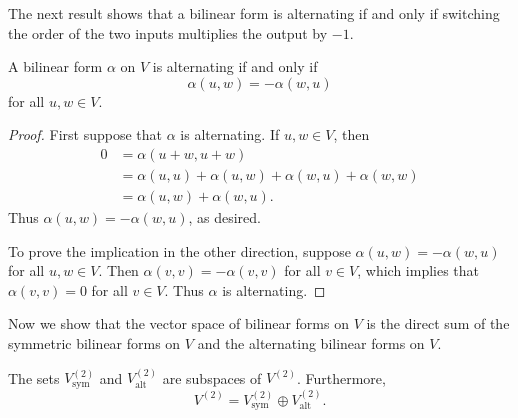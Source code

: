 The next result shows that a bilinear form is alternating if and only if
switching the order of the two inputs multiplies the output by $-1$.

\begin{result}\label{ax:9.16}
A bilinear form $\alpha$ on $V$ is alternating if and only if
\[ \alpha(u,w) = -\alpha(w,u) \]
for all $u,w\in V$.
\end{result}

\begin{proof}
First suppose that $\alpha$ is alternating. If $u,w\in V$, then
\begin{align*}
0 &= \alpha(u+w,u+w)\\
  &= \alpha(u,u)+\alpha(u,w)+\alpha(w,u)+\alpha(w,w)\\
  &= \alpha(u,w)+\alpha(w,u).
\end{align*}
Thus $\alpha(u,w)=-\alpha(w,u)$, as desired.

To prove the implication in the other direction, suppose
$\alpha(u,w)=-\alpha(w,u)$ for all $u,w\in V$. Then $\alpha(v,v)=-\alpha(v,v)$
for all $v\in V$, which implies that $\alpha(v,v)=0$ for all $v\in V$. Thus
$\alpha$ is alternating.
\end{proof}

Now we show that the vector space of bilinear forms on $V$ is the direct sum of
the symmetric bilinear forms on $V$ and the alternating bilinear forms on $V$.

\begin{result}[$V^{(2)}=V_{\mathrm{sym}}^{(2)}\oplus V_{\mathrm{alt}}^{(2)}$]\label{ax:9.17}
The sets $V_{\mathrm{sym}}^{(2)}$ and $V_{\mathrm{alt}}^{(2)}$ are subspaces of
$V^{(2)}$. Furthermore,
\[ V^{(2)} = V_{\mathrm{sym}}^{(2)}\oplus V_{\mathrm{alt}}^{(2)}. \]
\end{result}

